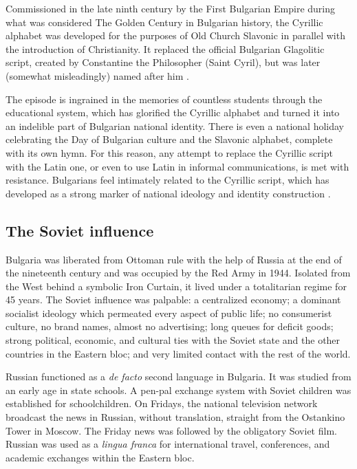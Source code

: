 \documentclass[output=paper]{langscibook}
\begin{document}
Commissioned in the late ninth century by the First Bulgarian Empire during what was considered The Golden Century in Bulgarian history, the Cyrillic alphabet was developed for the purposes of Old Church Slavonic in parallel with the introduction of Christianity. It replaced the official Bulgarian Glagolitic script, created by Constantine the Philosopher (Saint Cyril), but was later (somewhat misleadingly) named after him \citep{Iliev.2013}. 

The episode is ingrained in the memories of countless students through the educational system, which has glorified the Cyrillic alphabet and turned it into an indelible part of Bulgarian national identity. There is even a national holiday celebrating the Day of Bulgarian culture and the Slavonic alphabet, complete with its own hymn. For this reason, any attempt to replace the Cyrillic script with the Latin one, or even to use Latin in informal communications, is met with resistance. Bulgarians feel intimately related to the Cyrillic script, which has developed as a strong marker of national ideology and identity construction \citep{Norman.2019}.

\subsection{The Soviet influence}
Bulgaria was liberated from Ottoman rule with the help of Russia at the end of the nineteenth century and was occupied by the Red Army in 1944. Isolated from the West behind a symbolic Iron Curtain, it lived under a totalitarian regime for 45 years. The Soviet influence was palpable: a centralized economy; a dominant socialist ideology which permeated every aspect of public life; no consumerist culture, no brand names, almost no advertising; long queues for deficit goods; strong political, economic, and cultural ties with the Soviet state and the other countries in the Eastern bloc; and very limited contact with the rest of the world.

Russian functioned as a \textit{de facto} second language in Bulgaria. It was studied from an early age in state schools. A pen-pal exchange system with Soviet children was established for schoolchildren. On Fridays, the national television network broadcast the news in Russian, without translation, straight from the Ostankino Tower in Moscow. The Friday news was followed by the obligatory Soviet film. Russian was used as a \textit{lingua franca} for international travel, conferences, and academic exchanges within the Eastern bloc. 
\end{document}
